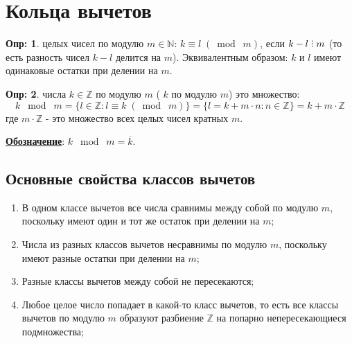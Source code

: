 \documentclass[12pt]{article}
\newcommand{\RN}[1]{%
	\textup{\uppercase\expandafter{\romannumeral#1}}%
}
\newcommand{\MN}{\mathbb{N}}
\newcommand{\MZ}{\mathbb{Z}}
\theoremstyle{definition}
\newtheorem{defn}{Опр:}
\DeclareRobustCommand{\divby}{%
	\mathrel{\text{\vbox{\baselineskip.65ex\lineskiplimit0pt\hbox{.}\hbox{.}\hbox{.}}}}%
}
\newcommand{\ovl}[1]{\overline{#1}}
\newcommand{\modn}[3]{#1 \equiv #2 \; (\bmod \; #3)}
\begin{document}
\lhead{Алгебра-\RN{1}}
\section*{Кольца вычетов}

\begin{defn}
	 целых чисел по модулю $m \in \MN$: $\modn{k}{l}{m}$, если $k - l \divby m$ (то есть разность чисел $k-l$ делится на $m$). Эквивалентным образом: $k$ и $l$ имеют одинаковые остатки при делении на $m$.
\end{defn}

\begin{defn}
	 числа $k \in \MZ$ по модулю $m$ ( $k$ по модулю $m$) это множество:
	$$
		k \; \bmod \; m = \{l \in \MZ \colon \modn{l}{k}{m}\} = \{l = k + m{\cdot}n \colon n \in \MZ\} = k + m{\cdot}\MZ
	$$
	где $m{\cdot}\MZ$ - это множество всех целых чисел кратных $m$.
\end{defn}
\textbf{\uline{Обозначение}}: $k \; \bmod \; m = \ovl{k}$.

\subsection*{Основные свойства классов вычетов}
\begin{enumerate}[label=\arabic*)]
	\item В одном классе вычетов все числа сравнимы между собой по модулю $m$, поскольку имеют один и тот же остаток при делении на $m$;
	\item Числа из разных классов вычетов несравнимы по модулю $m$, поскольку имеют разные остатки при делении на $m$;
	\item Разные классы вычетов между собой не пересекаются;
	\item Любое целое число попадает в какой-то класс вычетов, то есть все классы вычетов по модулю $m$ образуют разбиение $\MZ$ на попарно непересекающиеся подмножества;
\end{enumerate}
\end{document}
